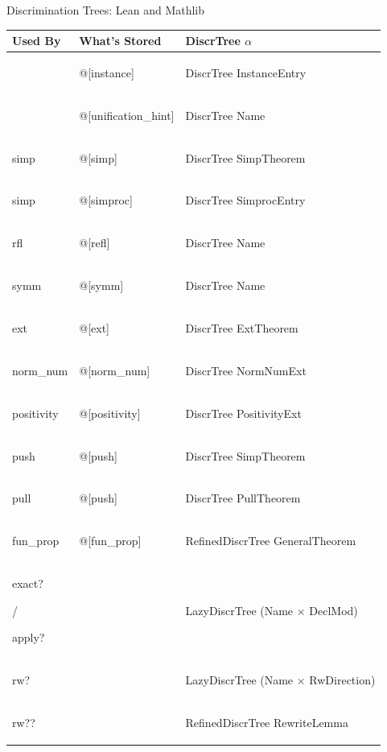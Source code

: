 \documentclass[t, 8pt]{beamer}  %
\newcounter{dtpart}
\newcommand{\dtpart}[1]{\stepcounter{dtpart}}
\newcommand{\code}[1]{%
  {\setlength{\fboxsep}{1.8pt}%
   \colorbox{codebg}{\ttfamily\footnotesize\color{ink}\strut #1}}%
}
\begin{document}
\dtpart{Lean and Mathlib}
\begin{frame}[label=navleanmathlib]{Discrimination Trees: Lean and Mathlib}
  \vspace{-0.1cm}
  \renewcommand{\arraystretch}{1.4}
  \begin{tabular}{@{}m{2cm}m{2.7cm}m{4cm}@{}}
    \textbf{Used By} & \textbf{What's Stored} & \textbf{DiscrTree $\alpha$} \\
    \toprule
    {\fontsize{7}{8.5}\selectfont{typeclass instances}} & \code{@[instance]} & \code{DiscrTree InstanceEntry} \\
    {\fontsize{7}{8.5}\selectfont{unification hints}} & \code{@[unification\_hint]} & \code{DiscrTree Name} \\
    \code{simp} & \code{@[simp]} & \code{DiscrTree SimpTheorem} \\
    \code{simp} {\fontsize{7}{8.5}\selectfont{(simprocs)}} & \code{@[simproc]} & \code{DiscrTree SimprocEntry} \\
    \code{rfl} & \code{@[refl]} & \code{DiscrTree Name} \\
    \code{symm} & \code{@[symm]} & \code{DiscrTree Name} \\
    \code{ext} & \code{@[ext]} & \code{DiscrTree ExtTheorem} \\
    \code{norm\_num} & \code{@[norm\_num]} & \code{DiscrTree NormNumExt} \\
    \code{positivity} & \code{@[positivity]} & \code{DiscrTree PositivityExt} \\
    \code{push} & \code{@[push]} & \code{DiscrTree SimpTheorem} \\
    \code{pull} & \code{@[push]} & \code{DiscrTree PullTheorem} \\
    \code{fun\_prop} & \code{@[fun\_prop]} & \code{RefinedDiscrTree GeneralTheorem} \\
    \code{exact?} / \code{apply?} & {\color{inkfaint} {\fontsize{7}{8.5}\selectfont{all imported declarations}}} & \code{LazyDiscrTree (Name $\times$ DeclMod)} \\
    \code{rw?} & {\color{inkfaint} {\fontsize{7}{8.5}\selectfont{all imported declarations}}} & \code{LazyDiscrTree (Name $\times$ RwDirection)} \\
    \code{rw??} & {\color{inkfaint} {\fontsize{7}{8.5}\selectfont{all imported declarations}}} & \code{RefinedDiscrTree RewriteLemma} \\[0.4em]
    \bottomrule
  \end{tabular}

\end{frame}
\end{document}
